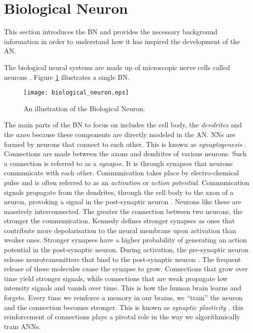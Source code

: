\section{Biological Neuron}
\label{sec:anns:bn}

This section introduces the \ac{BN} and provides the necessary background
information in order to understand how it has inspired the development
of the \ac{AN}. 

The biological neural systems are made up of microscopic nerve cells called
neurons \cite{ref:jain:1996}. Figure \ref{fig:biological_neuron} illustrates a
single \ac{BN}.

\begin{figure}[H]
    \centering
    \texttt{[image: biological\_neuron.eps]}
    \caption[The Biological Neuron]{An illustration of
    the Biological Neuron.}
    \label{fig:biological_neuron}
\end{figure}

The main parts of the \ac{BN} to focus on includes the cell body, the
\textit{dendrites} and the \textit{axon} because these
components are directly modeled in the \ac{AN}. \Acp{NN} are formed by
neurons that connect to each other. This is known as
\textit{synaptogenesis} \cite{ref:huttenlocher:1997}.
Connections are made between the axons and
dendrites of various neurons. Such a connection is referred to
as a \textit{synapse}. It is through synapses
that neurons communicate with each other. Communication takes place by
electro-chemical pulse and is often referred to as an \textit{activation} or
\textit{action potential}.  Communication signals propagate from the
dendrites, through the cell body to the axon of a neuron,
provoking a signal in the post-synaptic neuron \cite{ref:engelbrecht:2007}.
Neurons like these are massively interconnected.  The greater the connection
between two neurons, the stronger the communication.  Kennedy
\cite{ref:kennedy:2016} defines stronger synapses as ones that
contribute more depolarisation to the neural membrane upon activation than
weaker ones. Stronger synapses have a higher probability of
generating an action potential in the post-synaptic neuron. During activation,
the pre-synaptic neuron release neurotransmitters that bind to the post-synaptic
neuron \cite{ref:khanacademy:synapse}. The frequent release of these molecules
cause the synapse to grow. Connections that grow over time yield
stronger signals, while connections that are weak propagate low intensity
signals and vanish over time. This is how the human brain learns and forgets.
Every time we reinforce a memory in our brains, we ``train'' the neuron and the
connection becomes stronger. This is known as \textit{synaptic plasticity} \cite{ref:huttenlocher:1997}. this
reinforcement of connections plays a pivotal role in the way we algorithmically
train \acp{ANN}.


